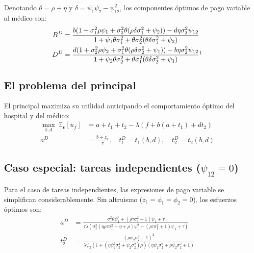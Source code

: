 \documentclass[12pt, a4paper, twoside, openright]{book}
\newcommand{\E}{\mathbb{E}}
\theoremstyle{plain}
\theoremstyle{definition}
\theoremstyle{remark}
\begin{document}
Denotando $\theta=\rho+\eta$ y $\delta=\psi_1\psi_2-\psi_{12}^2$, los componentes óptimos de pago variable al médico son:
\begin{align}
  B^D &= \frac{b(1+\sigma_1^2\rho\psi_1+\sigma_2^2\theta(\rho\delta\sigma_1^2+\psi_2))-d\eta\sigma_2^2\psi_{12}}{1+\psi_1\theta\sigma_1^2+\theta\sigma_2^2(\theta\delta\sigma_1^2+\psi_2)} \label{eq:BD}\\
  D^D &= \frac{d(1+\sigma_2^2\rho\psi_2+\sigma_1^2\theta(\rho\delta\sigma_2^2+\psi_1))-b\eta\sigma_2^2\psi_{12}}{1+\psi_2\theta\sigma_2^2+\theta\sigma_1^2(\theta\delta\sigma_2^2+\psi_1)} \label{eq:DD}\footnotemark
\end{align}

\subsection{El problema del principal}

El principal maximiza su utilidad anticipando el comportamiento óptimo del hospital y del médico:
\begin{align*}
  \max_{b,d}\ \E_{\bm{\epsilon}}[u_f] &= a+t_1+t_2-\lambda(f+b(a+t_1)+dt_2)\\
  a^D &= \frac{b+z_1}{\tau}, \quad t_1^D = t_1(b,d), \quad t_2^D = t_2(b,d)
\end{align*}

\subsection{Caso especial: tareas independientes (\texorpdfstring{$\psi_{12}=0$}{psi\_12=0})}

Para el caso de tareas independientes, las expresiones de pago variable se simplifican considerablemente. Sin altruismo ($z_1=\phi_1=\phi_2=0$), los esfuerzos óptimos son:
\begin{align}
  a^D &= \frac{\sigma_1^2\theta\psi_1^2+(\rho\tau\sigma_1^2+1)\psi_1+\tau}{\tau\lambda(\sigma_1^2(\eta\rho\tau\sigma_1^2+\eta+\rho)\psi_1^2+(\rho\tau\sigma_1^2+1)\psi_1+\tau)} \label{eq:aD_indep}\\
  t_2^D &= \frac{(\rho\psi_2\sigma_2^2+1)^2}{\lambda\psi_2(1+(\eta\psi_2^2\sigma_2^4+\psi_2\sigma_2^2)\rho)(\eta\psi_2\sigma_2^2+\rho\psi_2\sigma_2^2+1)} \label{eq:t2D_indep}
\end{align}
\end{document}
